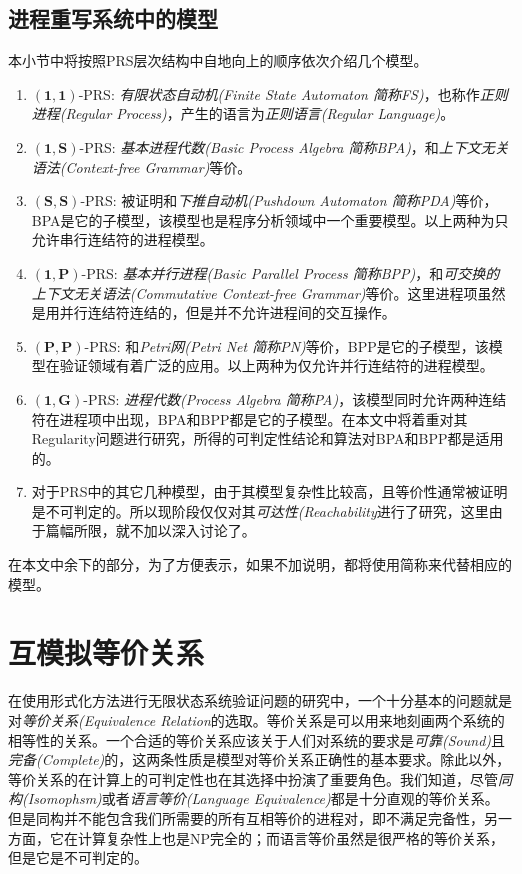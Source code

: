 \subsection{进程重写系统中的模型}
\label{subsec:models}

本小节中将按照PRS层次结构中自地向上的顺序依次介绍几个模型。
\begin{enumerate}
	\item $(\mathbf{1},\mathbf{1})$-PRS: \emph{有限状态自动机(Finite State Automaton 简称FS)}，也称作\emph{正则进程(Regular Process)}，产生的语言为\emph{正则语言(Regular Language)}。
	\item $(\mathbf{1},\mathbf{S})$-PRS: \emph{基本进程代数(Basic Process Algebra 简称BPA)}，和\emph{上下文无关语法(Context-free Grammar)}等价。
	\item $(\mathbf{S},\mathbf{S})$-PRS: 被证明和\emph{下推自动机(Pushdown Automaton 简称PDA)}等价，BPA是它的子模型，该模型也是程序分析领域中一个重要模型。以上两种为只允许串行连结符的进程模型。
	\item $(\mathbf{1},\mathbf{P})$-PRS: \emph{基本并行进程(Basic Parallel Process 简称BPP)}，和\emph{可交换的上下文无关语法(Commutative Context-free Grammar)}等价。这里进程项虽然是用并行连结符连结的，但是并不允许进程间的交互操作。
	\item $(\mathbf{P},\mathbf{P})$-PRS: 和\emph{Petri网(Petri Net 简称PN)}等价，BPP是它的子模型，该模型在验证领域有着广泛的应用。以上两种为仅允许并行连结符的进程模型。
	\item $(\mathbf{1},\mathbf{G})$-PRS: \emph{进程代数(Process Algebra 简称PA)}，该模型同时允许两种连结符在进程项中出现，BPA和BPP都是它的子模型。在本文中将着重对其Regularity问题进行研究，所得的可判定性结论和算法对BPA和BPP都是适用的。
	\item 对于PRS中的其它几种模型，由于其模型复杂性比较高，且等价性通常被证明是不可判定的。所以现阶段仅仅对其\emph{可达性(Reachability}进行了研究，这里由于篇幅所限，就不加以深入讨论了。
\end{enumerate}
在本文中余下的部分，为了方便表示，如果不加说明，都将使用简称来代替相应的模型。

\section{互模拟等价关系}
\label{sec:bis}

在使用形式化方法进行无限状态系统验证问题的研究中，一个十分基本的问题就是对\emph{等价关系(Equivalence Relation}的选取。等价关系是可以用来地刻画两个系统的相等性的关系。一个合适的等价关系应该关于人们对系统的要求是\emph{可靠(Sound)}且\emph{完备(Complete)}的，这两条性质是模型对等价关系正确性的基本要求。除此以外，等价关系的在计算上的可判定性也在其选择中扮演了重要角色。我们知道，尽管\emph{同构(Isomophsm)}或者\emph{语言等价(Language Equivalence)}都是十分直观的等价关系。但是同构并不能包含我们所需要的所有互相等价的进程对，即不满足完备性，另一方面，它在计算复杂性上也是NP完全的；而语言等价虽然是很严格的等价关系，但是它是不可判定的\cite{Hopcroft1979}。

